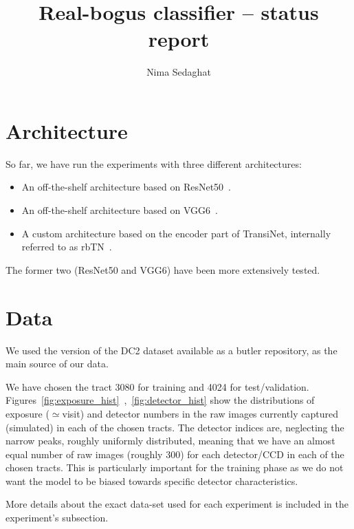 \documentclass[DM,authoryear,toc]{lsstdoc}
\title{Real-bogus classifier -- status report}
\author{%
Nima Sedaghat
}
\date{\vcsDate}
\begin{document}
\maketitle


\section{Architecture}
So far, we have run the experiments with three different architectures:

\begin{itemize}
\item{An off-the-shelf architecture based on ResNet50~\citep{he2016deep}.}
\item{An off-the-shelf architecture based on VGG6~\citep{simonyan2014very}.}
\item{A custom architecture based on the encoder part of TransiNet, internally referred to as rbTN~\citep{sedaghat2018effective}.}
\end{itemize}

The former two (ResNet50 and VGG6) have been more extensively tested.

\section{Data}
We used the version of the DC2 dataset available as a butler repository, as the main source of our data.

We have chosen the tract 3080 for training and 4024 for test/validation.
Figures~\ref{fig:exposure_hist}~,~\ref{fig:detector_hist} show the distributions of exposure ($\simeq$visit) and detector numbers in the raw images currently captured (simulated) in each of the chosen tracts. The detector indices are, neglecting the narrow peaks, roughly uniformly distributed, meaning that we have an almost equal number of raw images (roughly 300) for each detector/CCD in each of the chosen tracts. This is particularly important for the training phase as we do not want the model to be biased towards specific detector characteristics.

More details about the exact data-set used for each experiment is included in the experiment's subsection.
\end{document}
